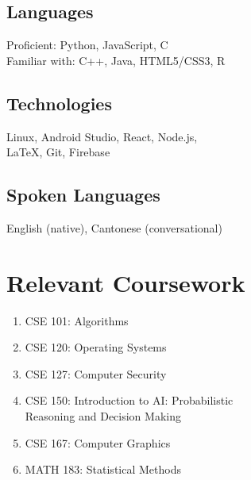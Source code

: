 \documentclass{article}
\begin{document}
\begin{paracol}{2}
\vspace{-0.5em}
\subsection{Languages} \hfill
	
	Proficient: Python, JavaScript, C\\
	\indent Familiar with: C++, Java, HTML5/CSS3, R
\vspace{-0.5em}
\subsection{Technologies} \hfill

	Linux, Android Studio, React, Node.js, \\\indent LaTeX, Git, Firebase
	
\vspace{-0.5em}
\subsection{Spoken Languages} \hfill

	English (native), Cantonese (conversational)
	
\section{Relevant Coursework}
\begin{enumerate}[leftmargin=0cm]
	\item[] CSE 101: Algorithms
	\item[] CSE 120: Operating Systems
	\item[] CSE 127: Computer Security
	\item[] CSE 150: Introduction to AI: Probabilistic\\Reasoning and Decision Making 
	\item[] CSE 167: Computer Graphics
	\item[] MATH 183: Statistical Methods
\end{enumerate}

\end{paracol}
\end{document}
